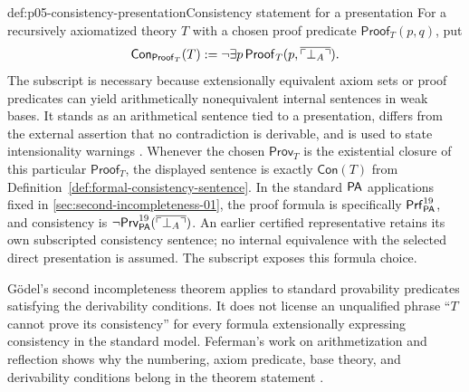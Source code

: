 \begin{hbdefinition}{def:p05-consistency-presentation}{Consistency statement for a presentation}
For a recursively axiomatized theory \(T\) with a chosen proof predicate
\(\mathsf{Proof}_T(p,q)\), put
\[
 \mathsf{Con}_{\mathsf{Proof}_T}(T)
 \mathrel{:=} \neg\exists p\,\mathsf{Proof}_T
   (p,\overline{\ulcorner\bot_A\urcorner}).
\]
The subscript is necessary because extensionally equivalent axiom sets or proof
predicates can yield arithmetically nonequivalent internal sentences in weak
bases. It stands as an arithmetical sentence tied to a presentation, differs
from the external assertion that no contradiction is derivable, and is used
to state intensionality warnings \cite{Feferman1960}. Whenever the chosen
\(\mathsf{Prov}_T\) is the existential closure of this particular
\(\mathsf{Proof}_T\), the displayed sentence is exactly
\(\mathsf{Con}(T)\) from
Definition~\ref{def:formal-consistency-sentence}. In the standard \(\mathsf{PA}\)
applications fixed in \cref{sec:second-incompleteness-01}, the proof formula
is specifically \(\mathsf{Prf}^{19}_{\mathsf{PA}}\), and consistency is
\(\neg\mathsf{Prv}^{19}_{\mathsf{PA}}
(\overline{\ulcorner\bot_A\urcorner})\).
An earlier certified representative retains its own subscripted consistency
sentence; no internal equivalence with the selected direct presentation is
assumed. The subscript exposes this formula choice.
\end{hbdefinition}

G\"odel's second incompleteness theorem applies to standard provability
predicates satisfying the derivability conditions. It does not license an
unqualified phrase ``\(T\) cannot prove its consistency'' for every formula
extensionally expressing consistency in the standard model. Feferman's work
on arithmetization and reflection shows why the numbering, axiom predicate,
base theory, and derivability conditions belong in the theorem statement
\cite{Feferman1960}.

